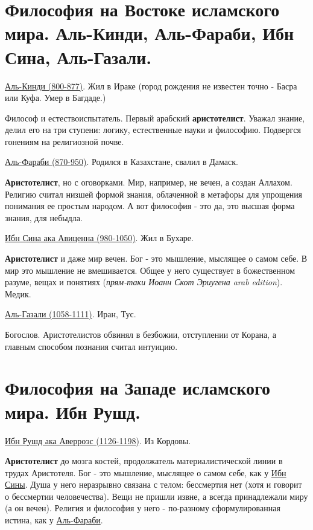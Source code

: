 \documentclass[12pt,a4paper]{article}
\begin{document}
\section{Философия на Востоке исламского мира. Аль-Кинди, Аль-Фараби, Ибн Сина, Аль-Газали.}
\hspace{8pt} 
\underline{Аль-Кинди (800-877)}. Жил в Ираке (город рождения не известен точно - Басра или Куфа. Умер в Багдаде.)

Философ и естествоиспытатель. Первый арабский \textbf{аристотелист}. Уважал знание, делил его на три ступени: логику, естественные науки и философию. Подвергся гонениям на религиозной почве.

\underline{Аль-Фараби (870-950)}. Родился в Казахстане, свалил в Дамаск.

\textbf{Аристотелист}, но с оговорками. Мир, например, не вечен, а создан Аллахом. Религию считал низшей формой знания, облаченной в метафоры для упрощения понимания ее простым народом. А вот философия - это да, это высшая форма знания, для небыдла.

\underline{Ибн Сина ака Авиценна (980-1050)}. Жил в Бухаре.


\textbf{Аристотелист} и даже мир вечен. Бог - это мышление, мыслящее о самом себе. В мир это мышление не вмешивается.
Общее у него существует в божественном разуме, вещах и понятиях (\textit{прям-таки Иоанн Скот Эриугена arab edition}). Медик.

\underline{Аль-Газали (1058-1111)}. Иран, Тус.

Богослов. Аристотелистов обвинял в безбожии, отступлении от Корана, а главным способом познания считал интуицию. 

\section{Философия на Западе исламского мира. Ибн Рушд.}
\hspace{8pt} 
\underline{Ибн Рушд ака Аверроэс (1126-1198)}. Из Кордовы.

\textbf{Аристотелист} до мозга костей, продолжатель материалистической линии в трудах Аристотеля. Бог - это мышление, мыслящее о самом себе, как у \underline{Ибн Сины}. Душа у него неразрывно связана с телом: бессмертия нет (хотя и говорит о бессмертии человечества). Вещи не пришли извне, а всегда принадлежали миру (а он вечен). Религия и философия у него - по-разному сформулированная истина, как у \underline{Аль-Фараби}.
\end{document}
